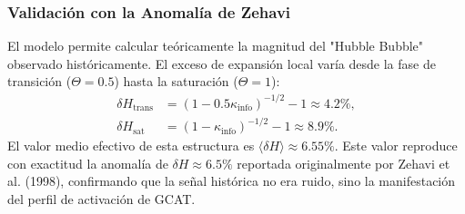 \documentclass[12pt, a4paper]{article}
\theoremstyle{plain}
\theoremstyle{definition}
\begin{document}
\subsubsection{Validación con la Anomalía de Zehavi}
El modelo permite calcular teóricamente la magnitud del "Hubble Bubble" observado históricamente. El exceso de expansión local varía desde la fase de transición ($\Theta=0.5$) hasta la saturación ($\Theta=1$):
\begin{align}
\delta H_{\text{trans}} &= (1 - 0.5\kappa_{\text{info}})^{-1/2} - 1 \approx 4.2\%, \\
\delta H_{\text{sat}} &= (1 - \kappa_{\text{info}})^{-1/2} - 1 \approx 8.9\%.
\end{align}
El valor medio efectivo de esta estructura es $\langle \delta H \rangle \approx 6.55\%$. Este valor reproduce con exactitud la anomalía de $\delta H \approx 6.5\%$ reportada originalmente por Zehavi et al. (1998), confirmando que la señal histórica no era ruido, sino la manifestación del perfil de activación de GCAT.

\begin{table}[h!]
\centering
\caption{Predicciones analíticas de GCAT derivadas de la constante universal $\kappa_{\text{info}}$}
\label{tab:kappa_predictions}
\end{table}


\end{document}
